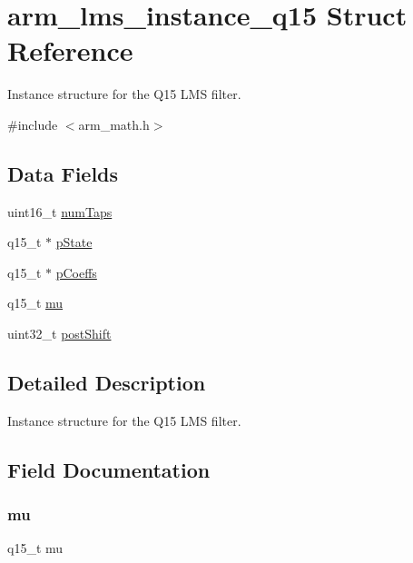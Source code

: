 \hypertarget{structarm__lms__instance__q15}{}\section{arm\+\_\+lms\+\_\+instance\+\_\+q15 Struct Reference}
\label{structarm__lms__instance__q15}


Instance structure for the Q15 L\+MS filter.  




{\ttfamily \#include $<$arm\+\_\+math.\+h$>$}

\subsection*{Data Fields}
\begin{DoxyCompactItemize}
\item 
uint16\+\_\+t \hyperlink{structarm__lms__instance__q15_a751941891e47f522a7f5375fe8990aac}{num\+Taps}
\item 
q15\+\_\+t $\ast$ \hyperlink{structarm__lms__instance__q15_ae29dfdb736374fcddaeaec4b7770170c}{p\+State}
\item 
q15\+\_\+t $\ast$ \hyperlink{structarm__lms__instance__q15_a7ca181a37f714d174445f486bebce26f}{p\+Coeffs}
\item 
q15\+\_\+t \hyperlink{structarm__lms__instance__q15_aab4745770bd667de040227eec1b5ff8d}{mu}
\item 
uint32\+\_\+t \hyperlink{structarm__lms__instance__q15_aa2cacddfc5e1d86905d7d31a18b1979b}{post\+Shift}
\end{DoxyCompactItemize}


\subsection{Detailed Description}
Instance structure for the Q15 L\+MS filter. 

\subsection{Field Documentation}
\mbox{\label{structarm__lms__instance__q15_aab4745770bd667de040227eec1b5ff8d}} 
\subsubsection{\texorpdfstring{mu}{mu}}
{\footnotesize\ttfamily q15\+\_\+t mu}

